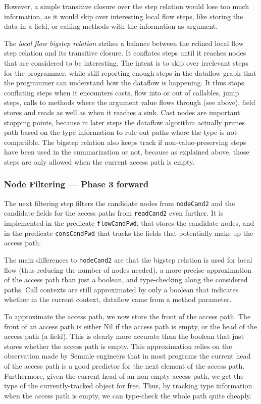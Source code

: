However, a simple transitive closure over the step relation would lose too much 
information, as it would skip over interesting local flow steps,
like storing the data in a field, or calling methods with the information as 
argument.

The \emph{local flow bigstep relation} strikes a balance between the refined 
local flow step relation and its transitive closure.
It conflates steps until it reaches nodes that are considered to be interesting.
The intent is to skip over irrelevant steps for the programmer, while still 
reporting enough steps in the dataflow graph that the programmer can understand 
how the dataflow is happening.
It thus stops conflating steps when it encounters casts, flow into or out of callables,
jump steps, calls to methods where the argument value flows through (see above), field 
stores and reads as well as when it reaches a sink. 
Cast nodes are important stopping points, because in later steps the dataflow 
algorithm actually prunes path based on the type information to rule out 
paths where the type is not compatible.
The bigstep relation also keeps track if non-value-preserving steps have been used 
in the summarization or not, because as explained above, those steps are only allowed 
when the current access path is empty.

\subsubsection*{Node Filtering --- Phase 3 forward}
The next filtering step filters the candidate nodes from \texttt{nodeCand2}
and the candidate fields for the access paths from \texttt{readCand2} even further.
It is implemented in the predicate \texttt{flowCandFwd}, that stores the candidate nodes,
and in the predicate \texttt{consCandFwd} that tracks the fields that potentially 
make up the access path.

The main differences to \texttt{nodeCand2} are that the bigstep relation is 
used for local flow (thus reducing the number of nodes needed), 
a more precise approximation of the access path than just a boolean,
and type-checking along the considered paths.
Call contexts are still approximated by only a boolean that indicates whether 
in the current context, dataflow came from a method parameter.

To approximate the access path, we now store the front of the access path.
The front of an access path is either Nil if the access path is empty,
or the head of the access path (a field).
This is clearly more accurate than the boolean that just stores whether the 
access path is empty.
This approximation relies on the observation made by Semmle engineers that
in most programs the current head of the access path is a
good predictor for the next element of the access path.
Furthermore, given the current head of an non-empty access path, we get the 
type of the currently-tracked object for free.
Thus, by tracking type information when the access path is empty, we can type-check
the whole path quite cheaply.

